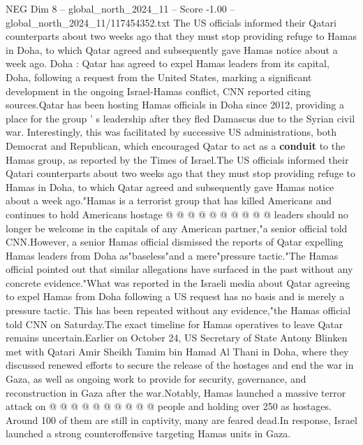 \begin{textsample}{NEG Dim 8 – global\_north\_2024\_11 – Score -1.00 – global\_north\_2024\_11/117454352.txt}  \label{ex:f8_neg_396}
The US officials informed their Qatari counterparts about two weeks ago that they must stop providing refuge to Hamas in Doha, to which Qatar agreed and subsequently gave Hamas notice about a week ago.
Doha : Qatar has agreed to expel Hamas leaders from its capital, Doha, following a request from the United States, marking a significant development in the ongoing Israel-Hamas conflict, CNN reported citing sources.Qatar has been hosting Hamas officials in Doha since 2012, providing a place for the group ' s leadership after they fled Damascus due to the Syrian civil war.
Interestingly, this was facilitated by successive US administrations, both Democrat and Republican, which encouraged Qatar to act as a \textbf{conduit} to the Hamas group, as reported by the Times of Israel.The US officials informed their Qatari counterparts about two weeks ago that they must stop providing refuge to Hamas in Doha, to which Qatar agreed and subsequently gave Hamas notice about a week ago."Hamas is a terrorist group that has killed Americans and continues to hold Americans hostage @ @ @ @ @ @ @ @ @ @ leaders should no longer be welcome in the capitals of any American partner,"a senior official told CNN.However, a senior Hamas official dismissed the reports of Qatar expelling Hamas leaders from Doha as"baseless"and a mere"pressure tactic."The Hamas official pointed out that similar allegations have surfaced in the past without any concrete evidence."What was reported in the Israeli media about Qatar agreeing to expel Hamas from Doha following a US request has no basis and is merely a pressure tactic.
This has been repeated without any evidence,"the Hamas official told CNN on Saturday.The exact timeline for Hamas operatives to leave Qatar remains uncertain.Earlier on October 24, US Secretary of State Antony Blinken met with Qatari Amir Sheikh Tamim bin Hamad Al Thani in Doha, where they discussed renewed efforts to secure the release of the hostages and end the war in Gaza, as well as ongoing work to provide for security, governance, and reconstruction in Gaza after the war.Notably, Hamas launched a massive terror attack on @ @ @ @ @ @ @ @ @ @ people and holding over 250 as hostages.
Around 100 of them are still in captivity, many are feared dead.In response, Israel launched a strong counteroffensive targeting Hamas units in Gaza.

\end{textsample}
